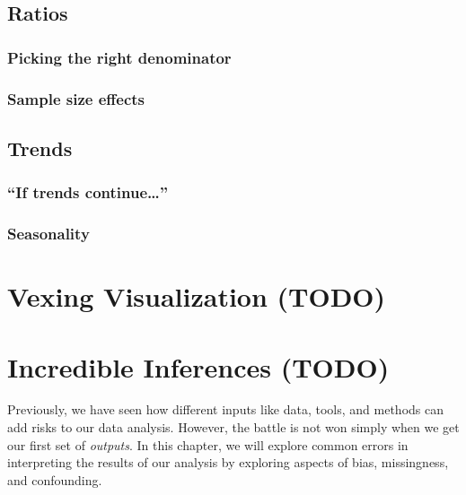 \documentclass[
]{krantz}
\begin{document}
\hypertarget{ratios}{%
\section{Ratios}\label{ratios}}

\hypertarget{picking-the-right-denominator}{%
\subsection{Picking the right denominator}\label{picking-the-right-denominator}}

\hypertarget{sample-size-effects}{%
\subsection{Sample size effects}\label{sample-size-effects}}

\hypertarget{trends}{%
\section{Trends}\label{trends}}

\hypertarget{if-trends-continue}{%
\subsection{\texorpdfstring{``If trends continue\ldots{}''}{``If trends continue\ldots''}}\label{if-trends-continue}}

\hypertarget{seasonality}{%
\subsection{Seasonality}\label{seasonality}}

\hypertarget{vex-viz}{%
\chapter{Vexing Visualization (TODO)}\label{vex-viz}}

\hypertarget{incr-infe}{%
\chapter{Incredible Inferences (TODO)}\label{incr-infe}}

Previously, we have seen how different inputs like data, tools, and methods can add risks to our data analysis. However, the battle is not won simply when we get our first set of \emph{outputs}. In this chapter, we will explore common errors in interpreting the results of our analysis by exploring aspects of bias, missingness, and confounding.
\end{document}
